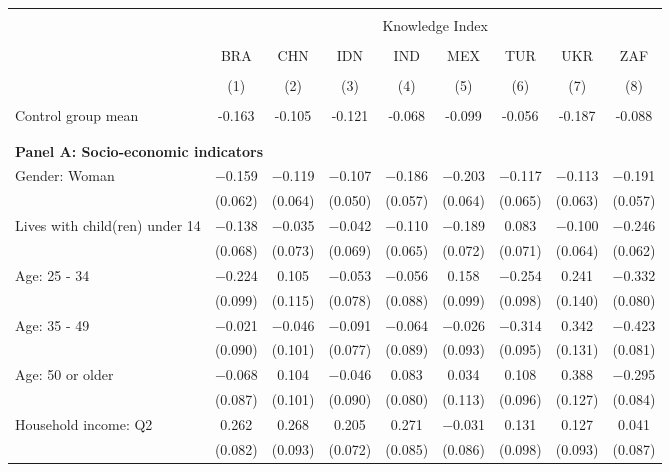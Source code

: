 
\begin{tabular}{@{\extracolsep{5pt}}lcccccccc} 
\\[-1.8ex]\hline 
\hline \\[-1.8ex] 
 & \multicolumn{8}{c}{Knowledge Index} \\ 
\cline{2-9} 
\\[-1.8ex] & BRA & CHN & IDN & IND & MEX & TUR & UKR & ZAF \\ 
\\[-1.8ex] & (1) & (2) & (3) & (4) & (5) & (6) & (7) & (8)\\ 
\hline \\[-1.8ex] 
Control group mean & -0.163 & -0.105 & -0.121 & -0.068 & -0.099 & -0.056 & -0.187 & -0.088   \\ \hline \\[-1.8ex]
\\[1ex]
\multicolumn{ 9 }{l}{\textbf{ Panel A: Socio-economic indicators }} \\
 Gender: Woman & $-$0.159 & $-$0.119 & $-$0.107 & $-$0.186 & $-$0.203 & $-$0.117 & $-$0.113 & $-$0.191 \\ 
  & (0.062) & (0.064) & (0.050) & (0.057) & (0.064) & (0.065) & (0.063) & (0.057) \\ 
  Lives with child(ren) under 14 & $-$0.138 & $-$0.035 & $-$0.042 & $-$0.110 & $-$0.189 & 0.083 & $-$0.100 & $-$0.246 \\ 
  & (0.068) & (0.073) & (0.069) & (0.065) & (0.072) & (0.071) & (0.064) & (0.062) \\ 
  Age: 25 - 34 & $-$0.224 & 0.105 & $-$0.053 & $-$0.056 & 0.158 & $-$0.254 & 0.241 & $-$0.332 \\ 
  & (0.099) & (0.115) & (0.078) & (0.088) & (0.099) & (0.098) & (0.140) & (0.080) \\ 
  Age: 35 - 49 & $-$0.021 & $-$0.046 & $-$0.091 & $-$0.064 & $-$0.026 & $-$0.314 & 0.342 & $-$0.423 \\ 
  & (0.090) & (0.101) & (0.077) & (0.089) & (0.093) & (0.095) & (0.131) & (0.081) \\ 
  Age: 50 or older & $-$0.068 & 0.104 & $-$0.046 & 0.083 & 0.034 & 0.108 & 0.388 & $-$0.295 \\ 
  & (0.087) & (0.101) & (0.090) & (0.080) & (0.113) & (0.096) & (0.127) & (0.084) \\ 
  Household income: Q2 & 0.262 & 0.268 & 0.205 & 0.271 & $-$0.031 & 0.131 & 0.127 & 0.041 \\ 
  & (0.082) & (0.093) & (0.072) & (0.085) & (0.086) & (0.098) & (0.093) & (0.087) \\ 

\end{tabular}
